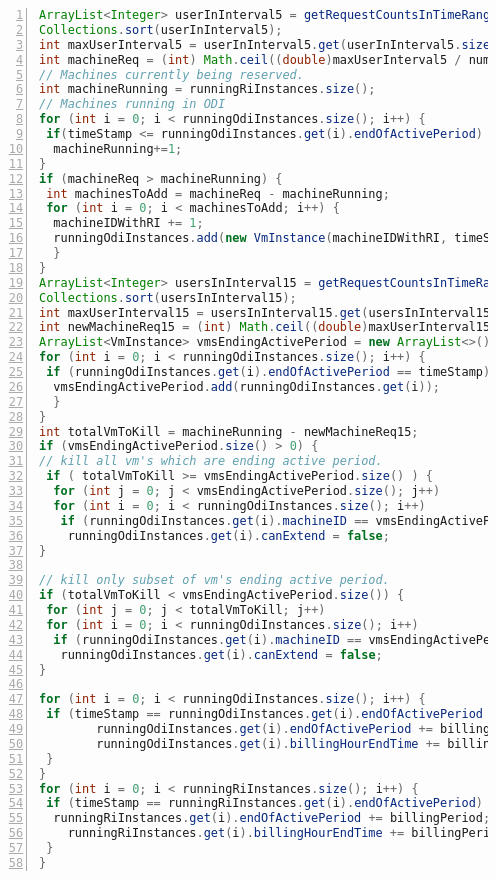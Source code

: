 \begin{lstlisting}[language=java,caption=AppElastic with RI and ODI instances,label=list:appelasticriodi,numbers=left,frame=single,fontadjust=true,breaklines,basicstyle=\small]
ArrayList<Integer> userInInterval5 = getRequestCountsInTimeRange(timeStamp, timeStamp + timeTakenToActive,false);
Collections.sort(userInInterval5);
int maxUserInterval5 = userInInterval5.get(userInInterval5.size() - 1);
int machineReq = (int) Math.ceil((double)maxUserInterval5 / numberOfUserPerInstance);
// Machines currently being reserved.
int machineRunning = runningRiInstances.size();
// Machines running in ODI
for (int i = 0; i < runningOdiInstances.size(); i++) {
 if(timeStamp <= runningOdiInstances.get(i).endOfActivePeriod)
  machineRunning+=1;
}
if (machineReq > machineRunning) {
 int machinesToAdd = machineReq - machineRunning;
 for (int i = 0; i < machinesToAdd; i++) {
  machineIDWithRI += 1;
  runningOdiInstances.add(new VmInstance(machineIDWithRI, timeStamp, timeStamp + billingPeriod, timeStamp + timeTakenToActive, (timeStamp + billingPeriod) - timetakenToShutdown));
  }
}
ArrayList<Integer> usersInInterval15 = getRequestCountsInTimeRange(timeStamp, timeStamp + scaleDownLookAhead,true);
Collections.sort(usersInInterval15);
int maxUserInterval15 = usersInInterval15.get(usersInInterval15.size() - 1);
int newMachineReq15 = (int) Math.ceil((double)maxUserInterval15 / numberOfUserPerInstance);
ArrayList<VmInstance> vmsEndingActivePeriod = new ArrayList<>();
for (int i = 0; i < runningOdiInstances.size(); i++) {
 if (runningOdiInstances.get(i).endOfActivePeriod == timeStamp) {
  vmsEndingActivePeriod.add(runningOdiInstances.get(i));
  }
}
int totalVmToKill = machineRunning - newMachineReq15;
if (vmsEndingActivePeriod.size() > 0) {
// kill all vm's which are ending active period.
 if ( totalVmToKill >= vmsEndingActivePeriod.size() ) {
  for (int j = 0; j < vmsEndingActivePeriod.size(); j++)
  for (int i = 0; i < runningOdiInstances.size(); i++)
   if (runningOdiInstances.get(i).machineID == vmsEndingActivePeriod.get(j).machineID)
  	runningOdiInstances.get(i).canExtend = false;
}

// kill only subset of vm's ending active period.
if (totalVmToKill < vmsEndingActivePeriod.size()) {
 for (int j = 0; j < totalVmToKill; j++)
 for (int i = 0; i < runningOdiInstances.size(); i++)
  if (runningOdiInstances.get(i).machineID == vmsEndingActivePeriod.get(j).machineID)
   runningOdiInstances.get(i).canExtend = false;
}

for (int i = 0; i < runningOdiInstances.size(); i++) {
 if (timeStamp == runningOdiInstances.get(i).endOfActivePeriod && runningOdiInstances.get(i).canExtend) {
  		runningOdiInstances.get(i).endOfActivePeriod += billingPeriod;
  		runningOdiInstances.get(i).billingHourEndTime += billingPeriod;
 }
}
for (int i = 0; i < runningRiInstances.size(); i++) {
 if (timeStamp == runningRiInstances.get(i).endOfActivePeriod) {
  runningRiInstances.get(i).endOfActivePeriod += billingPeriod;
	runningRiInstances.get(i).billingHourEndTime += billingPeriod;
 }
}
\end{lstlisting}
